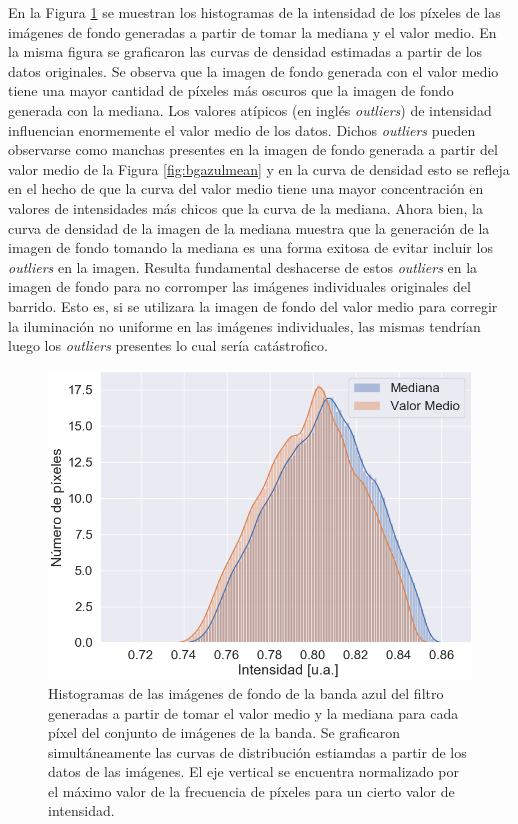 En la Figura \ref{fig:comparhists} se muestran los histogramas de la intensidad de los píxeles de las imágenes de fondo generadas a partir de tomar la mediana y el valor medio. En la misma figura se graficaron las curvas de densidad estimadas a partir de los datos originales. Se observa que la imagen de fondo generada con el valor medio tiene una mayor cantidad de píxeles más oscuros que la imagen de fondo generada con la mediana. Los valores atípicos (en inglés \textit{outliers}) de intensidad influencian enormemente el valor medio de los datos. Dichos \textit{outliers} pueden observarse como manchas presentes en la imagen de fondo generada a partir del valor medio de la Figura \ref{fig:bgazulmean} y en la curva de densidad esto se refleja en el hecho de que la curva del valor medio tiene una mayor concentración en valores de intensidades más chicos que la curva de la mediana. Ahora bien, la curva de densidad de la imagen de la mediana muestra que la generación de la imagen de fondo tomando la mediana es una forma exitosa de evitar incluir los \textit{outliers} en la imagen. Resulta fundamental deshacerse de estos \textit{outliers} en la imagen de fondo para no corromper las imágenes individuales originales del barrido. Esto es, si se utilizara la imagen de fondo del valor medio para corregir la iluminación no uniforme en las imágenes individuales, las mismas tendrían luego los \textit{outliers} presentes lo cual sería catástrofico.
\begin{figure}[H]
	\centering
\includegraphics[scale=0.9]{Figs/defectosZEISS/comparhistsmedi.png}
\caption{Histogramas de las imágenes de fondo de la banda azul del filtro generadas a partir de tomar el valor medio y la mediana para cada píxel del conjunto de imágenes de la banda. Se graficaron simultáneamente las curvas de distribución estiamdas a partir de los datos de las imágenes. El eje vertical se encuentra normalizado por el máximo valor de la frecuencia de píxeles para un cierto valor de intensidad.}
\label{fig:comparhists}
\end{figure}	
